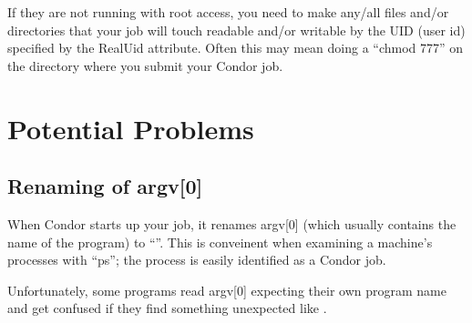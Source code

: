If they are not running with root access, you need to make any/all files
and/or directories that your job will touch readable and/or writable by
the UID (user id) specified by the RealUid attribute.  Often this may
mean doing a ``chmod 777'' on the directory where you submit your Condor
job.

\section{Potential Problems}

\subsection{Renaming of argv[0]}

When Condor starts up your job, it renames argv[0] (which usually
contains the name of the program) to ``''.  This is
conveinent when examining a machine's processes with ``ps''; the process
is easily identified as a Condor job.  

Unfortunately, some programs read argv[0] expecting their own program
name and get confused if they find something unexpected like
.
